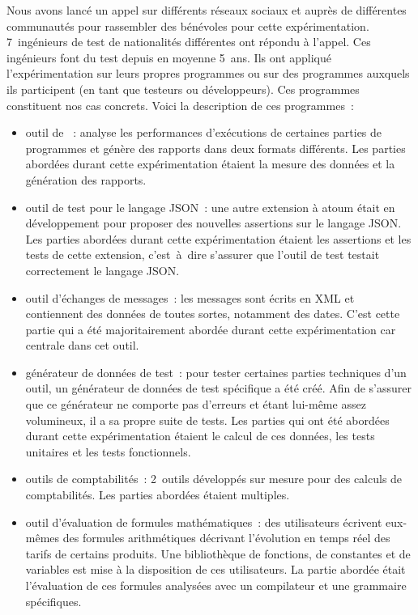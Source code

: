 Nous avons lancé un appel sur différents réseaux sociaux et auprès de
différentes communautés pour rassembler des bénévoles pour cette
expérimentation. 7~ingénieurs de test de nationalités différentes ont répondu à
l'appel. Ces ingénieurs font du test depuis en moyenne 5~ans. Ils ont appliqué
l'expérimentation sur leurs propres programmes ou sur des programmes auxquels
ils participent (en tant que testeurs ou développeurs). Ces programmes
constituent nos cas concrets. Voici la description de ces programmes~:
%
\begin{itemize}

\item outil de ~: analyse les performances d'exécutions de
certaines parties de programmes et génère des rapports dans deux formats
différents. Les parties abordées durant cette expérimentation étaient la mesure
des données et la génération des rapports.

\item outil de test pour le langage JSON~: une autre extension à atoum était en
développement pour proposer des nouvelles assertions sur le langage JSON. Les
parties abordées durant cette expérimentation étaient les assertions et les
tests de cette extension, c'est~à~dire s'assurer que l'outil de test testait
correctement le langage JSON.

\item outil d'échanges de messages~: les messages sont écrits en XML et
contiennent des données de toutes sortes, notamment des dates. C'est cette
partie qui a été majoritairement abordée durant cette expérimentation car
centrale dans cet outil.

\item générateur de données de test~: pour tester certaines parties techniques
d'un outil, un générateur de données de test spécifique a été créé. Afin de
s'assurer que ce générateur ne comporte pas d'erreurs et étant lui-même assez
volumineux, il a sa propre suite de tests. Les parties qui ont été abordées
durant cette expérimentation étaient le calcul de ces données, les tests
unitaires et les tests fonctionnels.

\item outils de comptabilités~: 2~outils développés sur mesure pour des calculs
de comptabilités. Les parties abordées étaient multiples.

\item outil d'évaluation de formules mathématiques~: des utilisateurs écrivent
eux-mêmes des formules arithmétiques décrivant l'évolution en temps réel des
tarifs de certains produits. Une bibliothèque de fonctions, de constantes et de
variables est mise à la disposition de ces utilisateurs. La partie abordée était
l'évaluation de ces formules analysées avec un compilateur et une grammaire
spécifiques.

\end{itemize}

